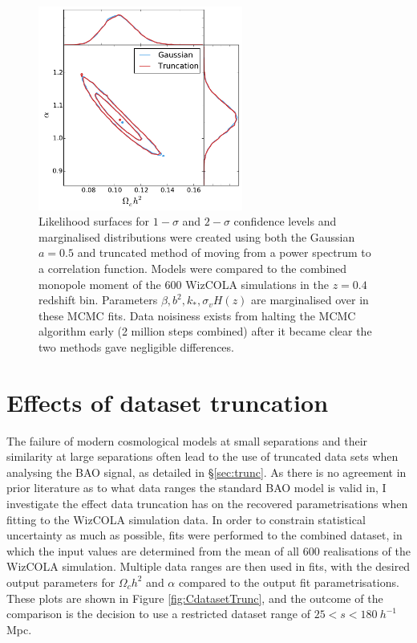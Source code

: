 \documentclass[titlesmallcaps, examinerscopy, copyrightpage]{uqthesis}
\begin{document}
\begin{appendices}
\begin{figure}[h!]
  \begin{center}
    \includegraphics[width=0.6\textwidth]{images/BcosmoComp.pdf}
  \end{center}
  \caption{Likelihood surfaces for $1-\sigma$ and $2-\sigma$ confidence levels and marginalised distributions were created using both the Gaussian $a=0.5$ and truncated method of moving from a power spectrum to a correlation function. Models were compared to the combined monopole moment of the 600 WizCOLA simulations in the $z=0.4$ redshift bin. Parameters $\beta, b^2, k_*, \sigma_v H(z)$ are marginalised over in these MCMC fits. Data noisiness exists from halting the MCMC algorithm early (2 million steps combined) after it became clear the two methods gave negligible differences.}
  \label{fig:BcosmoTest}
\end{figure}


\chapter{Effects of dataset truncation} \label{app:truncation}

The failure of modern cosmological models at small separations and their similarity at large separations often lead to the use of truncated data sets when analysing the BAO signal, as detailed in \S\ref{sec:trunc}. As there is no agreement in prior literature as to what data ranges the standard BAO model is valid in, I investigate the effect data truncation has on the recovered parametrisations when fitting to the WizCOLA simulation data. In order to constrain statistical uncertainty as much as possible, fits were performed to the combined dataset, in which the input values are determined from the mean of all 600 realisations of the WizCOLA simulation. Multiple data ranges are then used in fits, with the desired output parameters for $\Omega_c h^2$ and $\alpha$ compared to the output fit parametrisations. These plots are shown in Figure \ref{fig:CdatasetTrunc}, and the outcome of the comparison is the decision to use a restricted dataset range of $25 < s < 180 \ h^{-1}$ Mpc.






\end{appendices}
\end{document}
